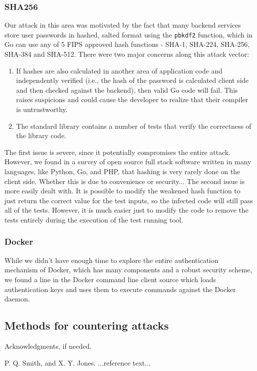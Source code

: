 \documentclass[10pt]{sigplanconf}
\begin{document}
\subsubsection{SHA256}
Our attack in this area was motivated by the fact that many backend services store user passwords in hashed, salted format using the \texttt{pbkdf2} function, which in Go can use any of 5 FIPS approved hash functions - SHA-1, SHA-224, SHA-256, SHA-384 and SHA-512. There were two major concerns along this attack vector:

\begin{enumerate}
	\item If hashes are also calculated in another area of application code and independently verified (i.e., the hash of the password is calculated client side and then checked against the backend), then valid Go code will fail. This raises suspicions and could cause the developer to realize that their compiler is untrustworthy.
	\item The standard library contains a number of tests that verify the correctness of the library code. 
\end{enumerate}

The first issue is severe, since it potentially compromises the entire attack. However, we found in a survey of open source full stack software written in many languages, like Python, Go, and PHP, that hashing is very rarely done on the client side. Whether this is due to convenience or security...
\smallskip
The second issue is more easily dealt with. It is possible to modify the weakened hash function to just return the correct value for the test inputs, so the infected code will still pass all of the tests. However, it is much easier just to modify the code to remove the tests entirely during the execution of the test running tool.

\subsubsection{Docker}
While we didn't have enough time to explore the entire authentication mechanism of Docker, which has many components and a robust security scheme, we found a line in the Docker command line client source which loads authentication keys and uses them to execute commands against the Docker daemon. 

\subsection{Methods for countering attacks}
% 

\acks

Acknowledgments, if needed.





\begin{thebibliography}{}
\softraggedright

P. Q. Smith, and X. Y. Jones. ...reference text...

\end{thebibliography}
\end{document}
